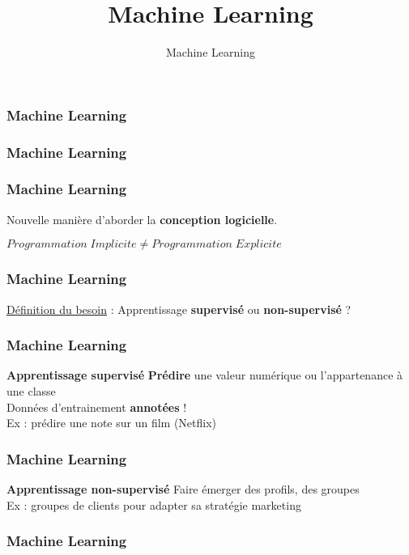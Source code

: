 \documentclass{formation}
\title{Machine Learning}
\subtitle{Machine Learning}
\begin{document}
\maketitle

\begin{frame}
  \frametitle{Machine Learning}
\end{frame}

\begin{frame}
  \frametitle{Machine Learning}
\end{frame}

\begin{frame}
  \frametitle{Machine Learning}
  \begin{center}
  Nouvelle manière d'aborder la \textbf{conception logicielle}.
  \end{center}
  \begin{center}
  $\boxed{Programmation\;Implicite \neq Programmation\;Explicite}$
  \end{center}
\end{frame}

\begin{frame}
  \frametitle{Machine Learning}
  \underline{Définition du besoin} :
  \newline
  \newline
  Apprentissage \textbf{supervisé} ou \textbf{non-supervisé} ?
\end{frame}

\begin{frame}
  \frametitle{Machine Learning}
  \textbf{Apprentissage supervisé}
  \newline \newline
  \textbf{Prédire} une valeur numérique ou l'appartenance à une classe\\
  \newline
  Données d'entrainement \textbf{annotées} ! \\
  \newline
  Ex : prédire une note sur un film (Netflix)
\end{frame}

\begin{frame}
  \frametitle{Machine Learning}
  \textbf{Apprentissage non-supervisé}
  \newline \newline
  Faire émerger des profils, des groupes \\
  \newline
  Ex : groupes de clients pour adapter sa stratégie marketing \\
\end{frame}

\begin{frame}
  \frametitle{Machine Learning}
\end{frame}
\end{document}
